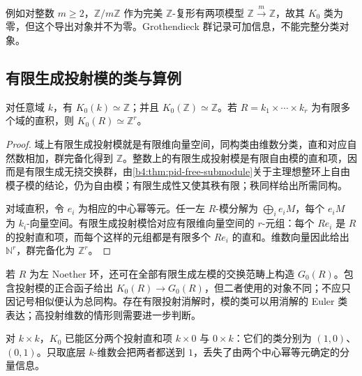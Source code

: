 例如对整数 \(m\ge2\)，\(\mathbb Z/m\mathbb Z\) 作为完美 \(\mathbb Z\)-复形有两项模型 \(\mathbb Z\xrightarrow{m}\mathbb Z\)，故其 \(K_0\) 类为零，但这个导出对象并不为零。Grothendieck 群记录可加信息，不能完整分类对象。

\subsection{有限生成投射模的类与算例}
\label{b4:subsec:B02:03}

\begin{proposition}\label{b4:prop:B-basic-k0}
	对任意域 \(k\)，有 \(K_0(k)\simeq\mathbb Z\)；并且 \(K_0(\mathbb Z)\simeq\mathbb Z\)。若 \(R=k_1\times\cdots\times k_r\) 为有限多个域的直积，则 \(K_0(R)\simeq\mathbb Z^r\)。
\end{proposition}
\begin{proof}
	域上有限生成投射模就是有限维向量空间，同构类由维数分类，直和对应自然数相加，群完备化得到 \(\mathbb Z\)。整数上的有限生成投射模是有限自由模的直和项，因而是有限生成无挠交换群，由\cref{b4:thm:pid-free-submodule}关于主理想整环上自由模子模的结论，仍为自由模；有限生成性又使其秩有限；秩同样给出所需同构。

	对域直积，令 \(e_i\) 为相应的中心幂等元。任一左 \(R\)-模分解为 \(\bigoplus_i e_iM\)，每个 \(e_iM\) 为 \(k_i\)-向量空间。有限生成投射模恰对应有限维向量空间的 \(r\)-元组：每个 \(Re_i\) 是 \(R\) 的投射直和项，而每个这样的元组都是有限多个 \(Re_i\) 的直和。维数向量因此给出 \(\mathbb N^r\)，群完备化为 \(\mathbb Z^r\)。
\end{proof}

若 \(R\) 为左 Noether 环，还可在全部有限生成左模的交换范畴上构造 \(G_0(R)\)。包含投射模的正合函子给出 \(K_0(R)\rightarrow G_0(R)\)，但二者使用的对象不同；不应只因记号相似便认为总同构。存在有限投射消解时，模的类可以用消解的 Euler 类表达；高投射维数的情形则需要进一步判断。

\ProseParagraphBreak
对 \(k\times k\)，\(K_0\) 已能区分两个投射直和项 \(k\times0\) 与 \(0\times k\)：它们的类分别为 \((1,0)\)、\((0,1)\)。只取底层 \(k\)-维数会把两者都送到 \(1\)，丢失了由两个中心幂等元确定的分量信息。

